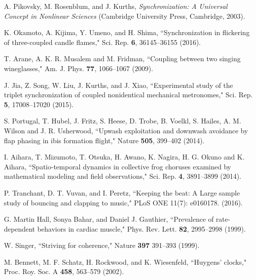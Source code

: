\documentclass[preprint,showpacs,preprintnumbers,amsmath,amssymb,aps,prb]{revtex4-1}
\theoremstyle{remark}
\begin{document}
\begin{thebibliography}{99}

 A. Pikovsky, M. Rosenblum, and J. Kurths, {\it Synchronization: A Universal Concept in Nonlinear Sciences} (Cambridge University Press, Cambridge, 2003).
  
 K. Okamoto, A. Kijima, Y. Umeno, and H. Shima, ``Synchronization in flickering of three-coupled candle flames," Sci. Rep. {\bf 6}, 36145--36155 (2016).

 T. Arane, A. K. R. Musalem and M. Fridman, ``Coupling between two singing wineglasses," Am. J. Phys. {\bf 77}, 1066--1067 (2009). %
  
  J. Jia, Z. Song, W. Liu, J. Kurths, and J. Xiao, ``Experimental study of the triplet synchronization of coupled nonidentical mechanical metronomes," Sci. Rep. {\bf 5}, 17008--17020 (2015).

  
 S. Portugal, T. Hubel, J. Fritz, S. Heese, D. Trobe, B. Voelkl, S. Hailes, A. M. Wilson and J. R. Usherwood,   ``Upwash exploitation and downwash avoidance by flap phasing in ibis formation flight," Nature {\bf 505}, 399--402 (2014).

   I. Aihara, T. Mizumoto, T. Otsuka, H. Awano, K. Nagira, H. G. Okuno and K. Aihara, ``Spatio-temporal dynamics in collective frog choruses examined by mathematical modeling and field observations," Sci. Rep. {\bf 4}, 3891--3899 (2014). 

   P. Tranchant, D. T. Vuvan, and I. Peretz, ``Keeping the beat: A Large sample study of bouncing and clapping to music," PLoS ONE 11(7): e0160178. (2016).

   G. Martin Hall, Sonya Bahar, and Daniel J. Gauthier, ``Prevalence of rate-dependent behaviors in cardiac muscle," Phys. Rev. Lett. {\bf 82}, 2995--2998 (1999).

   W. Singer, ``Striving for coherence,"  Nature {\bf 397} 391--393 (1999).

   M. Bennett, M. F. Schatz, H. Rockwood, and K. Wiesenfeld, ``Huygens' clocks," Proc. Roy. Soc. A {\bf 458}, 563–579 (2002).


\end{thebibliography}
\end{document}
